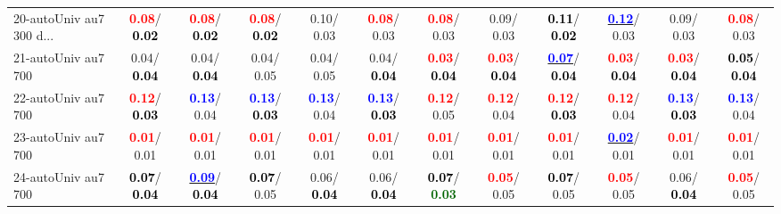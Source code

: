 \begin{table}[h]
\begin{center}
{\begin{tabular}{lc|c|c|c|c|c|c|c|c|c|c}
20-autoUniv au7 300 d... & \textcolor{red}{\textbf{  0.08}}/\textcolor{black}{\textbf{  0.02}} & \textcolor{red}{\textbf{  0.08}}/\textcolor{black}{\textbf{  0.02}} & \textcolor{red}{\textbf{  0.08}}/\textcolor{black}{\textbf{  0.02}} &   0.10/  0.03 & \textcolor{red}{\textbf{  0.08}}/  0.03 & \textcolor{red}{\textbf{  0.08}}/  0.03 &   0.09/  0.03 & \textcolor{black}{\textbf{  0.11}}/\textcolor{black}{\textbf{  0.02}} & \underline{\textcolor{blue}{\textbf{  0.12}}}/  0.03 &   0.09/  0.03 & \textcolor{red}{\textbf{  0.08}}/  0.03 \\
21-autoUniv au7 700 &   0.04/\textcolor{black}{\textbf{  0.04}} &   0.04/\textcolor{black}{\textbf{  0.04}} &   0.04/  0.05 &   0.04/  0.05 &   0.04/\textcolor{black}{\textbf{  0.04}} & \textcolor{red}{\textbf{  0.03}}/\textcolor{black}{\textbf{  0.04}} & \textcolor{red}{\textbf{  0.03}}/\textcolor{black}{\textbf{  0.04}} & \underline{\textcolor{blue}{\textbf{  0.07}}}/\textcolor{black}{\textbf{  0.04}} & \textcolor{red}{\textbf{  0.03}}/\textcolor{black}{\textbf{  0.04}} & \textcolor{red}{\textbf{  0.03}}/\textcolor{black}{\textbf{  0.04}} & \textcolor{black}{\textbf{  0.05}}/\textcolor{black}{\textbf{  0.04}} \\ \hline
22-autoUniv au7 700 & \textcolor{red}{\textbf{  0.12}}/\textcolor{black}{\textbf{  0.03}} & \textcolor{blue}{\textbf{  0.13}}/  0.04 & \textcolor{blue}{\textbf{  0.13}}/\textcolor{black}{\textbf{  0.03}} & \textcolor{blue}{\textbf{  0.13}}/  0.04 & \textcolor{blue}{\textbf{  0.13}}/\textcolor{black}{\textbf{  0.03}} & \textcolor{red}{\textbf{  0.12}}/  0.05 & \textcolor{red}{\textbf{  0.12}}/  0.04 & \textcolor{red}{\textbf{  0.12}}/\textcolor{black}{\textbf{  0.03}} & \textcolor{red}{\textbf{  0.12}}/  0.04 & \textcolor{blue}{\textbf{  0.13}}/\textcolor{black}{\textbf{  0.03}} & \textcolor{blue}{\textbf{  0.13}}/  0.04 \\
23-autoUniv au7 700 & \textcolor{red}{\textbf{  0.01}}/  0.01 & \textcolor{red}{\textbf{  0.01}}/  0.01 & \textcolor{red}{\textbf{  0.01}}/  0.01 & \textcolor{red}{\textbf{  0.01}}/  0.01 & \textcolor{red}{\textbf{  0.01}}/  0.01 & \textcolor{red}{\textbf{  0.01}}/  0.01 & \textcolor{red}{\textbf{  0.01}}/  0.01 & \textcolor{red}{\textbf{  0.01}}/  0.01 & \underline{\textcolor{blue}{\textbf{  0.02}}}/  0.01 & \textcolor{red}{\textbf{  0.01}}/  0.01 & \textcolor{red}{\textbf{  0.01}}/  0.01 \\
24-autoUniv au7 700 & \textcolor{black}{\textbf{  0.07}}/\textcolor{black}{\textbf{  0.04}} & \underline{\textcolor{blue}{\textbf{  0.09}}}/\textcolor{black}{\textbf{  0.04}} & \textcolor{black}{\textbf{  0.07}}/  0.05 &   0.06/\textcolor{black}{\textbf{  0.04}} &   0.06/\textcolor{black}{\textbf{  0.04}} & \textcolor{black}{\textbf{  0.07}}/\textcolor{darkgreen}{\textbf{  0.03}} & \textcolor{red}{\textbf{  0.05}}/  0.05 & \textcolor{black}{\textbf{  0.07}}/  0.05 & \textcolor{red}{\textbf{  0.05}}/  0.05 &   0.06/\textcolor{black}{\textbf{  0.04}} & \textcolor{red}{\textbf{  0.05}}/  0.05 \\

\end{tabular}}
\end{center}
\end{table}
